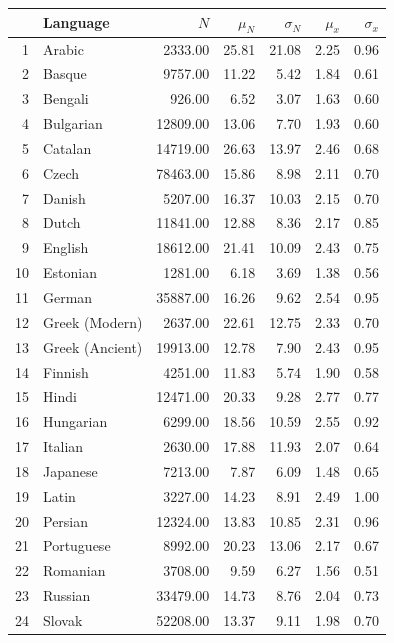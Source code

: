 \documentclass[a4paper]{article}
\begin{document}
\begin{table}[hbtp]
	\centering
	\begin{tabular}{rlrrrrr}
		\hline
		& Language & $N$ & $\mu_N$ & $\sigma_N$ & $\mu_x$ & $\sigma_x$ \\ 
		\hline
		1 & Arabic & 2333.00 & 25.81 & 21.08 & 2.25 & 0.96 \\ 
		2 & Basque & 9757.00 & 11.22 & 5.42 & 1.84 & 0.61 \\ 
		3 & Bengali & 926.00 & 6.52 & 3.07 & 1.63 & 0.60 \\ 
		4 & Bulgarian & 12809.00 & 13.06 & 7.70 & 1.93 & 0.60 \\ 
		5 & Catalan & 14719.00 & 26.63 & 13.97 & 2.46 & 0.68 \\ 
		6 & Czech & 78463.00 & 15.86 & 8.98 & 2.11 & 0.70 \\ 
		7 & Danish & 5207.00 & 16.37 & 10.03 & 2.15 & 0.70 \\ 
		8 & Dutch & 11841.00 & 12.88 & 8.36 & 2.17 & 0.85 \\ 
		9 & English & 18612.00 & 21.41 & 10.09 & 2.43 & 0.75 \\ 
		10 & Estonian & 1281.00 & 6.18 & 3.69 & 1.38 & 0.56 \\ 
		11 & German & 35887.00 & 16.26 & 9.62 & 2.54 & 0.95 \\ 
		12 & Greek (Modern) & 2637.00 & 22.61 & 12.75 & 2.33 & 0.70 \\ 
		13 & Greek (Ancient) & 19913.00 & 12.78 & 7.90 & 2.43 & 0.95 \\ 
		14 & Finnish & 4251.00 & 11.83 & 5.74 & 1.90 & 0.58 \\ 
		15 & Hindi & 12471.00 & 20.33 & 9.28 & 2.77 & 0.77 \\ 
		16 & Hungarian & 6299.00 & 18.56 & 10.59 & 2.55 & 0.92 \\ 
		17 & Italian & 2630.00 & 17.88 & 11.93 & 2.07 & 0.64 \\ 
		18 & Japanese & 7213.00 & 7.87 & 6.09 & 1.48 & 0.65 \\ 
		19 & Latin & 3227.00 & 14.23 & 8.91 & 2.49 & 1.00 \\ 
		20 & Persian & 12324.00 & 13.83 & 10.85 & 2.31 & 0.96 \\ 
		21 & Portuguese & 8992.00 & 20.23 & 13.06 & 2.17 & 0.67 \\ 
		22 & Romanian & 3708.00 & 9.59 & 6.27 & 1.56 & 0.51 \\ 
		23 & Russian & 33479.00 & 14.73 & 8.76 & 2.04 & 0.73 \\ 
		24 & Slovak & 52208.00 & 13.37 & 9.11 & 1.98 & 0.70 \\ 

\end{tabular}
\end{table}
\end{document}
